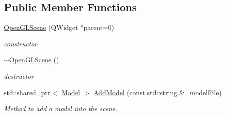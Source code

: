 \subsection*{Public Member Functions}
\begin{DoxyCompactItemize}
\item 
\hyperlink{classOpenGLScene_a22d3e62d9b562baf3f5cda3511a85578}{Open\+G\+L\+Scene} (Q\+Widget $\ast$parent=0)\hypertarget{classOpenGLScene_a22d3e62d9b562baf3f5cda3511a85578}{}\label{classOpenGLScene_a22d3e62d9b562baf3f5cda3511a85578}

\begin{DoxyCompactList}\small\item\em constructor \end{DoxyCompactList}\item 
\hyperlink{classOpenGLScene_a9e3b2533ed475dd7b7c103d5545c8636}{$\sim$\+Open\+G\+L\+Scene} ()\hypertarget{classOpenGLScene_a9e3b2533ed475dd7b7c103d5545c8636}{}\label{classOpenGLScene_a9e3b2533ed475dd7b7c103d5545c8636}

\begin{DoxyCompactList}\small\item\em destructor \end{DoxyCompactList}\item 
std\+::shared\+\_\+ptr$<$ \hyperlink{classModel}{Model} $>$ \hyperlink{classOpenGLScene_a0696eb5454ed88262869667fb3c49869}{Add\+Model} (const std\+::string \&\+\_\+model\+File)
\begin{DoxyCompactList}\small\item\em Method to add a model into the scene. \end{DoxyCompactList}\end{DoxyCompactItemize}
